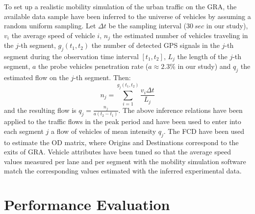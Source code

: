 \documentclass[conference]{IEEEtran}
\begin{document}
To set up a realistic mobility simulation of the urban traffic on the GRA, the available data sample have been inferred to the universe of vehicles by assuming a random uniform sampling. Let $\Delta t$ be the sampling interval ($30~sec$ in our study), $v_i$ the average speed of vehicle $i$, $n_j$ the estimated number of vehicles traveling in the $j$-th segment, $g_j(t_1,t_2)$ the number of detected GPS signals in the $j$-th segment during the observation time interval $[t_1,t_2]$, $L_j$ the length of the $j$-th segment, $a$ the probe vehicles penetration rate ($a \approx 2.3\%$ in our study) and $q_j$ the estimated flow on the $j$-th segment. Then: %
\begin{equation}
n_j=\sum_{i=1}^{g_j(t_1,t_2)} \frac{ v_i \Delta t}{L_j}
\end{equation}
and the resulting flow is $q_j = \frac{n_j}{a(t_2-t_1)}$. The above inference relations have been applied to the traffic flows in the peak period and have been used to enter into each segment $j$ a flow of vehicles of mean intensity $q_j$. The FCD have been used to estimate the OD matrix, where Origins and Destinations correspond to the exits of GRA. Vehicle attributes have been tuned so that the average speed values measured per lane and per segment with the mobility simulation software match the corresponding values estimated with the inferred experimental data.






\section{Performance Evaluation}
\label{performance}
\end{document}
